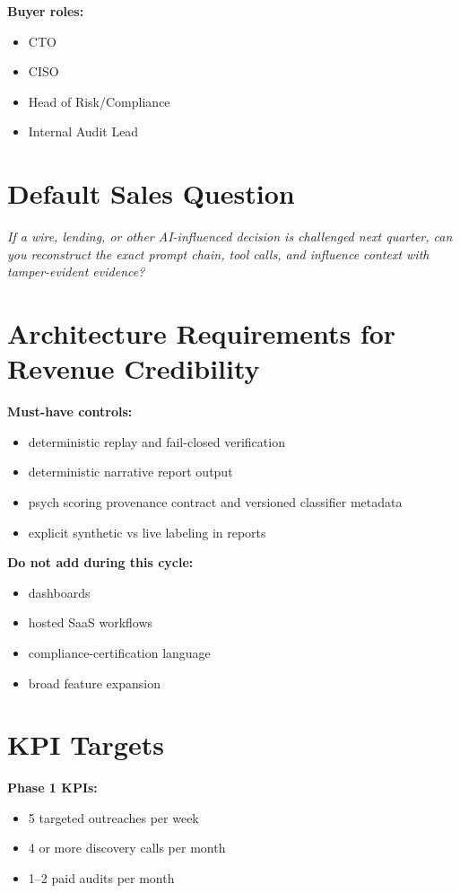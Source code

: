 \documentclass[11pt]{article}
\begin{document}
\textbf{Buyer roles:}
\begin{itemize}
  \item CTO
  \item CISO
  \item Head of Risk/Compliance
  \item Internal Audit Lead
\end{itemize}

\section*{Default Sales Question}
\textit{If a wire, lending, or other AI-influenced decision is challenged next quarter, can you reconstruct the exact prompt chain, tool calls, and influence context with tamper-evident evidence?}

\section*{Architecture Requirements for Revenue Credibility}
\textbf{Must-have controls:}
\begin{itemize}
  \item deterministic replay and fail-closed verification
  \item deterministic narrative report output
  \item psych scoring provenance contract and versioned classifier metadata
  \item explicit synthetic vs live labeling in reports
\end{itemize}

\textbf{Do not add during this cycle:}
\begin{itemize}
  \item dashboards
  \item hosted SaaS workflows
  \item compliance-certification language
  \item broad feature expansion
\end{itemize}

\section*{KPI Targets}
\textbf{Phase 1 KPIs:}
\begin{itemize}
  \item 5 targeted outreaches per week
  \item 4 or more discovery calls per month
  \item 1--2 paid audits per month
\end{itemize}
\end{document}
